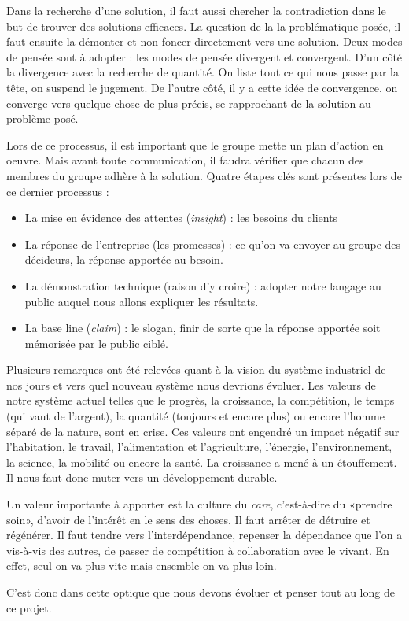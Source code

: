 Dans la recherche d'une solution, il faut aussi chercher la contradiction dans le but de trouver des solutions efficaces. La question de la la problématique posée, il faut ensuite la démonter et non foncer directement vers une solution.
Deux modes de pensée sont à adopter : les modes de pensée divergent et convergent. D'un côté la divergence avec la recherche de quantité. On liste tout ce qui nous passe par la tête, on suspend le jugement. De l'autre côté, il y a cette idée de convergence, on converge vers quelque chose de plus précis, se rapprochant de la solution au problème posé.

Lors de ce processus, il est important que le groupe mette un plan d'action en oeuvre. Mais avant toute communication, il faudra vérifier que chacun des membres du groupe adhère à la solution. Quatre étapes clés sont présentes lors de ce dernier processus :
\begin{itemize}
\item La mise en évidence des attentes (\emph{insight}) : les besoins du clients
\item La réponse de l'entreprise (les promesses) : ce qu'on va envoyer au groupe des décideurs, la réponse apportée au besoin.
\item La démonstration technique (raison d'y croire) : adopter notre langage au public auquel nous allons expliquer les résultats.
\item La base line (\emph{claim}) : le slogan, finir de sorte que la réponse apportée soit mémorisée par le public ciblé.
\end{itemize}

Plusieurs remarques ont été relevées quant à la vision du système industriel de nos jours et vers quel nouveau système nous devrions évoluer.
Les valeurs de notre système actuel telles que le progrès, la croissance, la compétition, le temps (qui vaut de l'argent), la quantité (toujours et encore plus) ou encore l'homme séparé de la nature, sont en crise. Ces valeurs ont engendré un impact négatif sur l'habitation, le travail, l'alimentation et l'agriculture, l'énergie, l'environnement, la science, la mobilité ou encore la santé. La croissance a mené à un étouffement. Il nous faut donc muter vers un développement durable.

Un valeur importante à apporter est la culture du \emph{care}, c'est-à-dire du «prendre soin», d'avoir de l'intérêt en le sens des choses. Il faut arrêter de détruire et régénérer.
Il faut tendre vers l'interdépendance, repenser la dépendance que l'on a vis-à-vis des autres, de passer de compétition à collaboration avec le vivant. En effet, seul on va plus vite mais ensemble on va plus loin.

C'est donc dans cette optique que nous devons évoluer et penser tout au long de ce projet.
